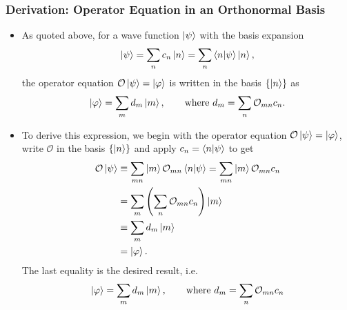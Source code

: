 \documentclass[11pt, a4paper]{article}
\renewcommand{\O}{\mathcal{O}}  %
\newcommand{\p}{\psi}  %
\begin{document}
\subsubsection{Derivation: Operator Equation in an Orthonormal Basis}
\begin{itemize}
    \item As quoted above, for a wave function $ \ket{\psi} $ with the basis expansion
	\begin{equation*}
		\ket{\psi} = \sum_{n}c_{n} \ket{n} = \sum_{n} \braket{n}{\psi} \ket{n},
	\end{equation*}
    the operator equation $ \O \ket{\psi} = \ket{\varphi} $ is written in the basis $ \{\ket{n}\} $ as
    \begin{equation*}
        \ket{\varphi} = \sum_{m}d_{m}\ket{m}, \qquad \text{where } d_{m} = \sum_{n} \O_{mn} c_{n}.
    \end{equation*}
	
    \item To derive this expression, we begin with the operator equation $ \O \ket{\psi} = \ket{\varphi} $, write $ \O $ in the basis $ \{\ket{n}\} $ and apply $ c_{n} = \bra{n} \ket{\psi} $ to get
	\begin{align*}
		\O \ket{\p} &\equiv \sum_{mn}\ket{m}\O_{mn}\bra{n}  \ket{\psi} = \sum_{mn}\ket{m} \O_{mn}  c_{n}\\
		& = \sum_{m}\left(\sum_{n}\O_{mn}c_{n}\right) \ket{m} \\
		& \equiv \sum_{m}d_{m}\ket{m} \\
		& = \ket{\varphi}.
	\end{align*}
    The last equality is the desired result, i.e.
	\begin{equation*}
		\ket{\varphi} = \sum_{m} d_{m}\ket{m}, \qquad \text{where } d_{m} = \sum_{n}\O_{mn} c_{n}
	\end{equation*}
	
\end{itemize}
\end{document}
